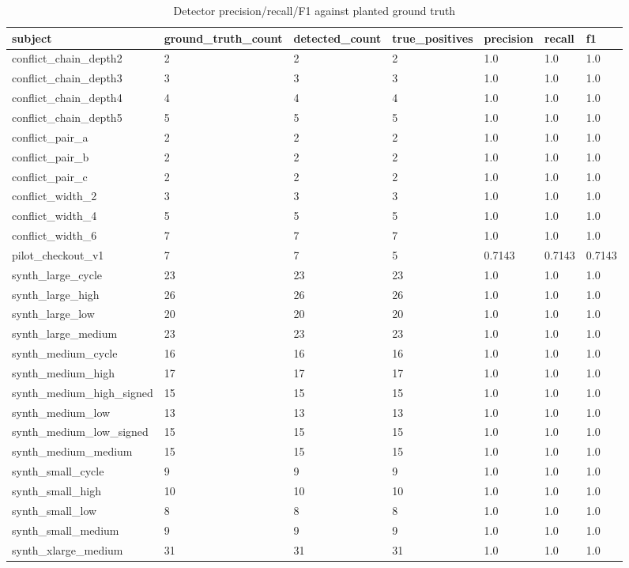 \begin{table}[t]
\centering
\caption{Detector precision/recall/F1 against planted ground truth}
\label{tab:detector-quality}
\begin{tabular}{lllllll}
\toprule
subject & ground\_truth\_count & detected\_count & true\_positives & precision & recall & f1 \\
\midrule
conflict\_chain\_depth2 & 2 & 2 & 2 & 1.0 & 1.0 & 1.0 \\
conflict\_chain\_depth3 & 3 & 3 & 3 & 1.0 & 1.0 & 1.0 \\
conflict\_chain\_depth4 & 4 & 4 & 4 & 1.0 & 1.0 & 1.0 \\
conflict\_chain\_depth5 & 5 & 5 & 5 & 1.0 & 1.0 & 1.0 \\
conflict\_pair\_a & 2 & 2 & 2 & 1.0 & 1.0 & 1.0 \\
conflict\_pair\_b & 2 & 2 & 2 & 1.0 & 1.0 & 1.0 \\
conflict\_pair\_c & 2 & 2 & 2 & 1.0 & 1.0 & 1.0 \\
conflict\_width\_2 & 3 & 3 & 3 & 1.0 & 1.0 & 1.0 \\
conflict\_width\_4 & 5 & 5 & 5 & 1.0 & 1.0 & 1.0 \\
conflict\_width\_6 & 7 & 7 & 7 & 1.0 & 1.0 & 1.0 \\
pilot\_checkout\_v1 & 7 & 7 & 5 & 0.7143 & 0.7143 & 0.7143 \\
synth\_large\_cycle & 23 & 23 & 23 & 1.0 & 1.0 & 1.0 \\
synth\_large\_high & 26 & 26 & 26 & 1.0 & 1.0 & 1.0 \\
synth\_large\_low & 20 & 20 & 20 & 1.0 & 1.0 & 1.0 \\
synth\_large\_medium & 23 & 23 & 23 & 1.0 & 1.0 & 1.0 \\
synth\_medium\_cycle & 16 & 16 & 16 & 1.0 & 1.0 & 1.0 \\
synth\_medium\_high & 17 & 17 & 17 & 1.0 & 1.0 & 1.0 \\
synth\_medium\_high\_signed & 15 & 15 & 15 & 1.0 & 1.0 & 1.0 \\
synth\_medium\_low & 13 & 13 & 13 & 1.0 & 1.0 & 1.0 \\
synth\_medium\_low\_signed & 15 & 15 & 15 & 1.0 & 1.0 & 1.0 \\
synth\_medium\_medium & 15 & 15 & 15 & 1.0 & 1.0 & 1.0 \\
synth\_small\_cycle & 9 & 9 & 9 & 1.0 & 1.0 & 1.0 \\
synth\_small\_high & 10 & 10 & 10 & 1.0 & 1.0 & 1.0 \\
synth\_small\_low & 8 & 8 & 8 & 1.0 & 1.0 & 1.0 \\
synth\_small\_medium & 9 & 9 & 9 & 1.0 & 1.0 & 1.0 \\
synth\_xlarge\_medium & 31 & 31 & 31 & 1.0 & 1.0 & 1.0 \\
\bottomrule
\end{tabular}
\end{table}
